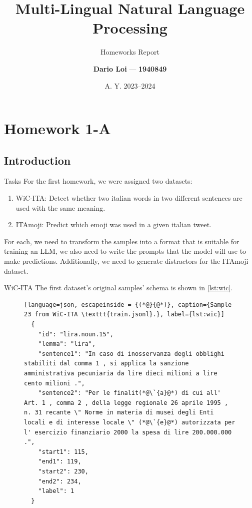 \documentclass[english, xcolor={table,usenames}]{beamer}
\author{\textbf{Dario Loi} --- \textbf{1940849}}
\title{Multi-Lingual Natural Language Processing}
\subtitle{Homeworks Report}
\institute{M.Sc. in AI \& Robotics, \\ Sapienza, University of Rome.}
\date{A. Y. 2023--2024}
\begin{document}
\maketitle

\section{Homework 1-A}

\subsection{Introduction}
\begin{frame}{Tasks}
  For the first homework, we were assigned \alert{two} datasets:

  \begin{enumerate}
    \item WiC-ITA: Detect whether two italian words in two \alert{different} sentences are used with the \alert{same} meaning.
    \item ITAmoji: Predict which emoji was used in a given italian tweet.
  \end{enumerate}

  For each, we need to transform the samples into a format that is suitable for training an LLM, we also need to
  write the prompts that the model will use to make predictions. Additionally, we need to generate \alert{distractors} for the ITAmoji dataset.
\end{frame}


\begin{frame}[fragile]{WiC-ITA}
  The first dataset's original samples' schema is shown in \cref{lst:wic}.
  \begin{figure}[H]
    \centering

    \begin{lstlisting}[language=json, escapeinside = {(*@}{@*)}, caption={Sample 23 from WiC-ITA \texttt{train.jsonl}.}, label={lst:wic}]
  {
    "id": "lira.noun.15",
    "lemma": "lira",
    "sentence1": "In caso di inosservanza degli obblighi stabiliti dal comma 1 , si applica la sanzione amministrativa pecuniaria da lire dieci milioni a lire cento milioni .",
    "sentence2": "Per le finalit(*@\`{a}@*) di cui all' Art. 1 , comma 2 , della legge regionale 26 aprile 1995 , n. 31 recante \" Norme in materia di musei degli Enti locali e di interesse locale \" (*@\`{e}@*) autorizzata per l' esercizio finanziario 2000 la spesa di lire 200.000.000 .",
    "start1": 115,
    "end1": 119,
    "start2": 230,
    "end2": 234,
    "label": 1
  }
  \end{lstlisting}
  \end{figure}

\end{frame}
\end{document}
